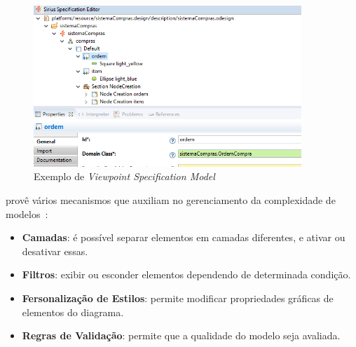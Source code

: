 \begin{figure}[h]
	\centering
	\includegraphics[width=0.9\textwidth]{figuras/exemplos-emf/exemplo-sirius-vsm.png}
	\caption{Exemplo de \textit{Viewpoint Specification Model}}
	\label{exemplo-sirius}
\end{figure}

\sirius provê vários mecanismos que auxiliam no gerenciamento da complexidade de modelos~\cite{madiot2015eclipse}:

\begin{itemize}
	\item \textbf{Camadas}: é possível separar elementos em camadas diferentes, e ativar ou desativar essas.
	\item \textbf{Filtros}: exibir ou esconder elementos dependendo de determinada condição.
	\item \textbf{Fersonalização de Estilos}: permite modificar propriedades gráficas de elementos do diagrama.
	\item \textbf{Regras de Validação}: permite que a qualidade do modelo seja avaliada.
\end{itemize}

